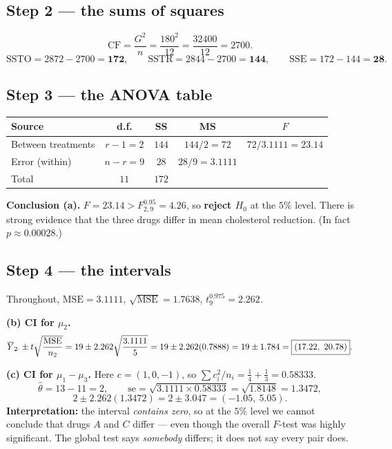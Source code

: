 \documentclass[11pt]{article}
\begin{document}
\subsection{Step 2 --- the sums of squares}

\[
  \mathrm{CF}=\frac{G^2}{n}=\frac{180^2}{12}=\frac{32400}{12}=2700 .
\]
\[
  \mathrm{SSTO}=2872-2700=\mathbf{172},\qquad
  \mathrm{SSTR}=2844-2700=\mathbf{144},\qquad
  \mathrm{SSE}=172-144=\mathbf{28}.
\]

\subsection{Step 3 --- the ANOVA table}

\begin{center}
\begin{tabular}{@{}lcccc@{}}
\toprule
Source & d.f. & SS & MS & $F$\\
\midrule
Between treatments & $r-1=2$ & $144$ & $144/2=72$ & $72/3.1111=\mathbf{23.14}$\\
Error (within) & $n-r=9$ & $28$ & $28/9=3.1111$ & \\
\midrule
Total & $11$ & $172$ & & \\
\bottomrule
\end{tabular}
\end{center}

\textbf{Conclusion (a).} $F=23.14 > F^{0.95}_{2,9}=4.26$, so \textbf{reject $H_0$} at the
$5\%$ level. There is strong evidence that the three drugs differ in mean cholesterol
reduction. (In fact $p\approx0.00028$.)

\subsection{Step 4 --- the intervals}

Throughout, $\mathrm{MSE}=3.1111$, $\sqrt{\mathrm{MSE}}=1.7638$, $t^{0.975}_9=2.262$.

\medskip
\textbf{(b) CI for $\mu_2$.}
\[
  \overline{Y}_{2\cdot}\pm t\sqrt{\frac{\mathrm{MSE}}{n_2}}
  = 19 \pm 2.262\sqrt{\frac{3.1111}{5}}
  = 19 \pm 2.262(0.7888)
  = 19\pm 1.784
  = \boxed{(17.22,\ 20.78)} .
\]

\medskip
\textbf{(c) CI for $\mu_1-\mu_3$.} Here $c=(1,0,-1)$, so
$\sum c_i^2/n_i=\tfrac14+\tfrac13=0.58333$.
\[
  \hat\theta=13-11=2,\qquad
  \mathrm{se}=\sqrt{3.1111\times0.58333}=\sqrt{1.8148}=1.3472,
\]
\[
  2\pm 2.262(1.3472)=2\pm3.047=\boxed{(-1.05,\ 5.05)} .
\]
\textbf{Interpretation:} the interval \emph{contains zero}, so at the $5\%$ level we cannot
conclude that drugs $A$ and $C$ differ --- even though the overall $F$-test was highly
significant. The global test says \emph{somebody} differs; it does not say every pair does.
\end{document}
